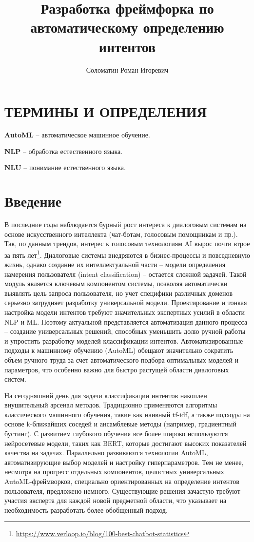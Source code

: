 \documentclass[14pt,a4paper,oneside,openany]{book}
\author{Соломатин Роман Игоревич}
\date{}
\title{Разработка фреймфорка по автоматическому определению интентов}
\begin{document}
\MyTOC

\chapter*{ТЕРМИНЫ И ОПРЕДЕЛЕНИЯ}
\label{sec:orge3707f8}
\textbf{AutoML} -- автоматическое машинное обучение.

\textbf{NLP} -- обработка естественного языка.

\textbf{NLU} -- понимание естественного языка.
\chapter*{Введение}
\label{sec:org52c6dc1}
В последние годы наблюдается бурный рост интереса к диалоговым системам на основе искусственного интеллекта (чат-ботам, голосовым помощникам и пр.). Так, по данным трендов, интерес к голосовым технологиям AI вырос почти втрое за пять лет\footnote{\url{https://www.verloop.io/blog/100-best-chatbot-statistics}}. Диалоговые системы внедряются в бизнес-процессы и повседневную жизнь, однако создание их интеллектуальной части – модели определения намерения пользователя (intent classification) – остается сложной задачей. Такой модуль является ключевым компонентом системы, позволяя автоматически выявлять цель запроса пользователя, но учет специфики различных доменов серьезно затрудняет разработку универсальной модели. Проектирование и тонкая настройка модели интентов требуют значительных экспертных усилий в области NLP и ML. Поэтому актуальной представляется автоматизация данного процесса – создание универсальных решений, способных уменьшить долю ручной работы и упростить разработку моделей классификации интентов. Автоматизированные подходы к машинному обучению (AutoML) обещают значительно сократить объем ручного труда за счет автоматического подбора оптимальных моделей и параметров, что особенно важно для быстро растущей области диалоговых систем.

На сегодняшний день для задачи классификации интентов накоплен внушительный арсенал методов. Традиционно применяются алгоритмы классического машинного обучения, такие как наивный tf-idf\autocite{joneskarensparck_statistical_1972}, а также подходы на основе k-ближайших соседей и ансамблевые методы (например, градиентный бустинг). С развитием глубокого обучения все более широко используются нейросетевые модели, таких как BERT\autocite{devlin_bert_2019}, которые достигают высоких показателей качества на задачах. Параллельно развиваются технологии AutoML, автоматизирующие выбор моделей и настройку гиперпараметров. Тем не менее, несмотря на прогресс отдельных компонентов, целостных универсальных AutoML-фреймворков, специально ориентированных на определение интентов пользователя, предложено немного. Существующие решения зачастую требуют участия эксперта для каждой новой предметной области, что указывает на необходимость разработать более обобщенный подход.
\end{document}
